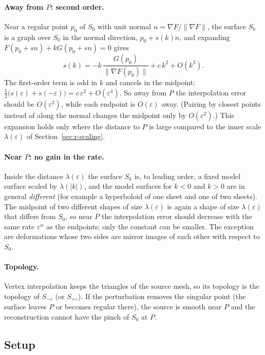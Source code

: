 \documentclass[12pt, a4paper]{article}
\theoremstyle{plain}
\theoremstyle{definition}
\theoremstyle{remark}
\theoremstyle{definition}
\begin{document}
\paragraph{Away from $P$: second order.} Near a regular point $p_0$ of $S_0$ with
unit normal $n=\nabla F/\|\nabla F\|$, the surface $S_k$ is a graph over $S_0$ in
the normal direction, $p_0+s(k)n$, and expanding $F(p_0+sn)+kG(p_0+sn)=0$ gives
\[
s(k)=-k\,\frac{G(p_0)}{\|\nabla F(p_0)\|}+c\,k^2+O(k^3).
\]
The first-order term is odd in $k$ and cancels in the midpoint:
$\tfrac12\big(s(\varepsilon)+s(-\varepsilon)\big)=c\,\varepsilon^2+O(\varepsilon^4)$.
So away from $P$ the interpolation error should be $O(\varepsilon^2)$, while each
endpoint is $O(\varepsilon)$ away. (Pairing by closest points instead of along the
normal changes the midpoint only by $O(\varepsilon^2)$.) This expansion holds only
where the distance to $P$ is large compared to the inner scale $\lambda(\varepsilon)$
of Section~\ref{sec:r-scaling}.

\paragraph{Near $P$: no gain in the rate.} Inside the distance $\lambda(\varepsilon)$
the surface $S_k$ is, to leading order, a fixed model surface scaled by
$\lambda(|k|)$, and the model surfaces for $k<0$ and $k>0$ are in general
\emph{different} (for example a hyperboloid of one sheet and one of two sheets).
The midpoint of two different shapes of size $\lambda(\varepsilon)$ is again a
shape of size $\lambda(\varepsilon)$ that differs from $S_0$, so near $P$ the
interpolation error should decrease with the same rate $\varepsilon^\alpha$ as the
endpoints; only the constant can be smaller. The exception are deformations whose
two sides are mirror images of each other with respect to $S_0$.

\paragraph{Topology.} Vertex interpolation keeps the triangles of the source mesh,
so its topology is the topology of $S_{-\varepsilon}$ (or $S_{+\varepsilon}$). If
the perturbation removes the singular point (the surface leaves $P$ or becomes
regular there), the source is smooth near $P$ and the reconstruction cannot have
the pinch of $S_0$ at $P$.

\subsection{Setup}
\label{sec:r-interp-setup}
\end{document}
